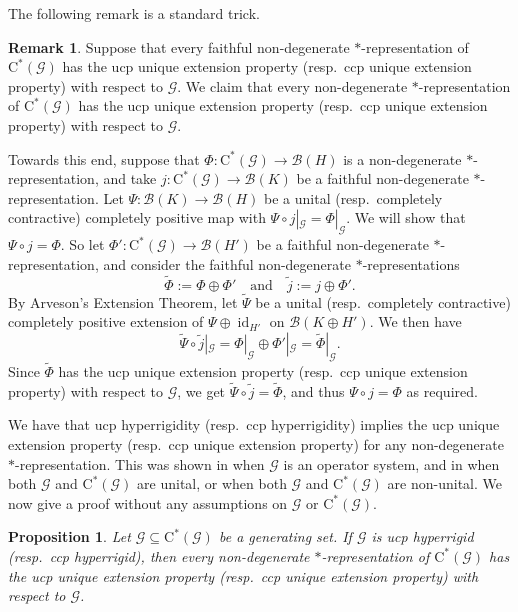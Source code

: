 \documentclass[11pt, draft]{amsart}
\numberwithin{equation}{section}
\theoremstyle{plain}
\newtheorem{proposition}[theorem]{Proposition}
\theoremstyle{definition}
\newtheorem{remark}[theorem]{Remark}
\theoremstyle{remark}
\newcommand{\B}{{\mathcal{B}}}
\newcommand{\G}{{\mathcal{G}}}
\newcommand{\qand}{\quad\text{and}\quad}
\newcommand{\ca}{\mathrm{C}^*}
\newcommand{\wt}{\widetilde}
\newcommand{\id}{{\operatorname{id}}}
\begin{document}
The following remark is a standard trick.

\begin{remark}\label{R:faithful}
Suppose that every faithful non-degenerate $*$-representation of $\ca(\G)$ has the ucp unique extension property (resp.\ ccp unique extension property) with respect to $\G$.
We claim that every non-degenerate $*$-representation of $\ca(\G)$ has the ucp unique extension property (resp.\ ccp unique extension property) with respect to $\G$. 

Towards this end, suppose that $\Phi \colon \ca(\G) \to \B(H)$ is a non-degenerate $*$-representation, and take $j\colon \ca(\G) \to \B(K)$ be a faithful non-degenerate $*$-representation.
Let $\Psi \colon \B(K) \to \B(H)$ be a unital (resp.\ completely contractive) completely positive map  with $\Psi \circ j|_\G = \Phi|_\G$. 
We will show that $\Psi \circ j = \Phi$.
So let $\Phi' \colon \ca(\G)\to \B(H')$ be a faithful non-degenerate $*$-representation, and consider the faithful non-degenerate $*$-representations 
\[
\wt{\Phi} := \Phi \oplus \Phi'
\qand
\wt{j} := j \oplus \Phi'.
\]
By Arveson's Extension Theorem, let $\wt{\Psi}$ be a unital (resp.\ completely contractive) completely positive extension of $\Psi \oplus \id_{H'}$ on $\B(K \oplus H')$.
We then have 
\[
\wt{\Psi} \circ \wt{j}|_\G = \Phi|_{\G} \oplus \Phi'|_\G = \wt{\Phi}|_\G.
\]
Since $\wt{\Phi}$ has the ucp unique extension property (resp.\ ccp unique extension property) with respect to $\G$, we get $\wt{\Psi} \circ \wt{j} = \wt{\Phi}$, and thus $\Psi \circ j =\Phi$ as required.
\end{remark} 

We have that ucp hyperrigidity (resp.\ ccp hyperrigidity) implies the ucp unique extension property (resp.\ ccp unique extension property) for any non-degenerate $*$-representation. 
This was shown in \cite[Theorem 2.1]{Arv11} when $\G$ is an operator system, and in \cite[Theorem 2.8]{Sal17} when both $\G$ and $\ca(\G)$ are unital, or when both $\G$ and $\ca(\G)$ are non-unital. 
We now give a proof without any assumptions on $\G$ or $\ca(\G)$. 

\begin{proposition}\label{P:hypuep}
Let $\G \subseteq \ca(\G)$ be a generating set.
If $\G$ is ucp hyperrigid (resp.\ ccp hyperrigid), then every non-degenerate $*$-representation of $\ca(\G)$ has the ucp unique extension property (resp.\ ccp unique extension property) with respect to $\G$.
\end{proposition}
\end{document}
